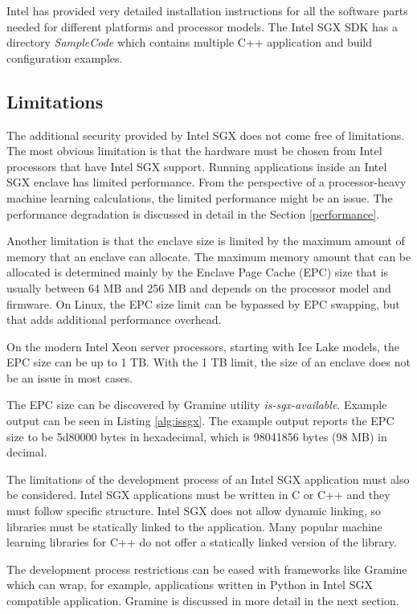 Intel has provided very detailed installation instructions for all the software parts needed for different platforms and processor models.\cite{sgxinstall} The Intel SGX SDK has a directory \textit{SampleCode} which contains multiple C++ application and build configuration examples.

\subsection{Limitations}\label{limitations}

The additional security provided by Intel SGX does not come free of limitations. The most obvious limitation is that the hardware must be chosen from Intel processors that have Intel SGX support. Running applications inside an Intel SGX enclave has limited performance. From the perspective of a processor-heavy machine learning calculations, the limited performance might be an issue. The performance degradation is discussed in detail in the Section \ref{performance}.

Another limitation is that the enclave size is limited by the maximum amount of memory that an enclave can allocate. The maximum memory amount that can be allocated is determined mainly by the Enclave Page Cache (EPC) size that is usually between 64 MB and 256 MB and depends on the processor model and firmware. On Linux, the EPC size limit can be bypassed by EPC swapping, but that adds additional performance overhead. \cite{graminedocs}

On the modern Intel Xeon server processors, starting with Ice Lake models, the EPC size can be up to 1 TB. With the 1 TB limit, the size of an enclave does not be an issue in most cases.

The EPC size can be discovered by Gramine\cite{gramine} utility \textit{is-sgx-available}. Example output can be seen in Listing \ref{alg:issgx}. The example output reports the EPC size to be 5d80000 bytes in hexadecimal, which is 98041856 bytes (98 MB) in decimal. 

The limitations of the development process of an Intel SGX application must also be considered. Intel SGX applications must be written in C or C++ and they must follow specific structure. Intel SGX does not allow dynamic linking, so libraries must be statically linked to the application. Many popular machine learning libraries for C++ do not offer a statically linked version of the library.\cite{sgxdev}

The development process restrictions can be eased with frameworks like Gramine\cite{gramine} which can wrap, for example, applications written in Python in Intel SGX compatible application. Gramine is discussed in more detail in the next section.

